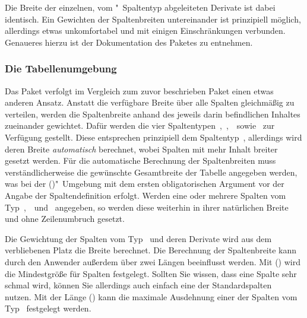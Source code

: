 \documentclass[%
  english,ngerman,%
  cdgeometry=no,DIV=12,%
  automark,%
  listof=toc,%
]{tudscrartcl}
\begin{document}
\InputCode\noindent
%
Die Breite der einzelnen, vom "~Spaltentyp abgeleiteten Derivate ist 
dabei identisch. Ein Gewichten der Spaltenbreiten untereinander ist prinzipiell 
möglich, allerdings etwas unkomfortabel und mit einigen Einschränkungen 
verbunden. Genaueres hierzu ist der Dokumentation des Paketes 
 zu entnehmen.



\subsubsection{Die Tabellenumgebung }
\label{sec:tabulary}%
%
Das Paket  verfolgt im Vergleich zum zuvor beschrieben Paket 
 einen etwas anderen Ansatz. Anstatt die verfügbare Breite 
über alle Spalten gleichmäßig zu verteilen, werden die Spaltenbreite anhand des 
jeweils darin befindlichen Inhaltes zueinander gewichtet. Dafür werden die vier 
Spaltentypen~,~,~~sowie~ zur Verfügung 
gestellt. Diese entsprechen prinzipiell dem Spaltentyp~, allerdings 
wird deren Breite \emph{automatisch} berechnet, wobei Spalten mit mehr Inhalt 
breiter gesetzt werden. Für die automatische Berechnung der Spaltenbreiten muss 
verständlicherweise die gewünschte Gesamtbreite der Tabelle angegeben werden, 
was bei der ()"~Umgebung mit dem ersten 
obligatorischen Argument vor der Angabe der Spaltendefinition erfolgt. Werden 
eine oder mehrere Spalten vom Typ~,~~und~ 
angegeben, so werden diese weiterhin in ihrer natürlichen Breite und ohne 
Zeilenumbruch gesetzt. 

Die Gewichtung der Spalten vom Typ~ und deren Derivate wird aus 
dem verbliebenen Platz die Breite berechnet. Die Berechnung der Spaltenbreite 
kann durch den Anwender außerdem über zwei Längen beeinflusst werden. Mit 
() wird die Mindestgröße für Spalten 
festgelegt. Sollten Sie wissen, dass eine Spalte sehr schmal wird, können Sie 
allerdings auch einfach eine der Standardspalten~ nutzen. Mit der 
Länge () kann die maximale Ausdehnung einer der 
Spalten vom Typ~ festgelegt werden. 
\end{document}
